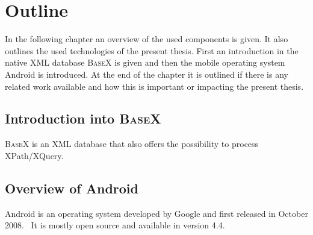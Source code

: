 \chapter{Outline}
\label{cha:overview}
In the following chapter an overview of the used components is given.
It also outlines the used technologies of the present thesis.
First an introduction in the native XML database \textsc{BaseX} is given and then the mobile operating system Android is introduced.
At the end of the chapter it is outlined if there is any related work available and how this is important or impacting the present thesis.


%

\section{Introduction into \textsc{BaseX}}
\label{sec:overview:introduction-into-basex}
\textsc{BaseX} is an XML database that also offers the possibility to process XPath/XQuery.

\section{Overview of Android}
\label{sec:overview:overview-of-android}
Android is an operating system developed by Google and first released in October 2008.~\cite{developers2011android}
It is mostly open source and available in version 4.4.

